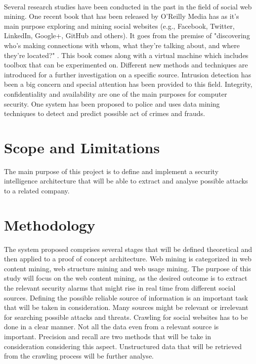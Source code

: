 \documentclass[12pt]{article}
\begin{document}
\paragraph{}
Several research studies have been conducted in the past in the field of social web mining. One recent book that has been released by  O'Reilly Media has as it's main purpose exploring and mining social websites (e.g., Facebook, Twitter, LinkedIn, Google+, GitHub and others). It goes from the premise of "discovering who’s making connections with whom, what they’re talking about, and where they’re located?" \cite{first}. This book comes along with a virtual machine which includes toolbox that can be experimented on\cite{second}. Different new methods and techniques are introduced for a further investigation on a specific source. Intrusion detection\cite{intrusion-detection} has been a big concern and special attention has been provided to this field. Integrity, confidentiality and availability are one of the main purposes for computer security.  One system\cite{third} has been proposed to police and uses data mining techniques to  detect and predict possible act of crimes and frauds. 


\section{Scope and Limitations}

The main purpose of this project is to define and implement a security intelligence architecture that will be able to extract and analyse possible attacks to a related company. 

 
\section{Methodology}
\paragraph{}
The system proposed comprises several stages that will be defined theoretical and then applied to a proof of concept architecture. Web mining is categorized in web content mining, web structure mining and web usage mining. The purpose of this study will focus on the web content mining, as the desired outcome is to extract the relevant security alarms that might rise in real time from different social sources. Defining the possible reliable source of information is an important task that will be taken in consideration. Many sources might be relevant or irrelevant for searching possible attacks and threats.  Crawling for social websites has to be done in a clear manner. Not all the data even from a relevant source is important. Precision and recall are two methods that will be take in consideration considering this aspect. Unstructured data that will be retrieved from the crawling process will be further analyse.
\end{document}
